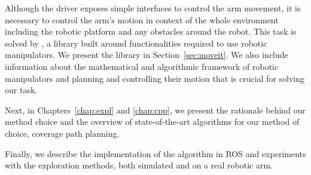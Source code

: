 \documentclass[buriama8_dp.tex]{subfiles}
\begin{document}
Although the driver exposes simple interfaces to control the arm movement, it is necessary to control the arm's motion in context of the whole environment including the robotic platform and any obstacles around the robot. This task is solved by , a library built around functionalities required to use robotic manipulators. We present the library in Section~\ref{sec:moveit}. We also include information about the mathematical and algorithmic framework of robotic manipulators and planning and controlling their motion that is crucial for solving our task.

Next, in Chapters~\ref{chap:expl} and \ref{chap:cpp}, we present the rationale behind our method choice and the overview of state-of-the-art algorithms for our method of choice, coverage path planning.

Finally, we describe the implementation of the algorithm in ROS and experiments with the exploration methods, both simulated and on a real robotic arm.
\end{document}
